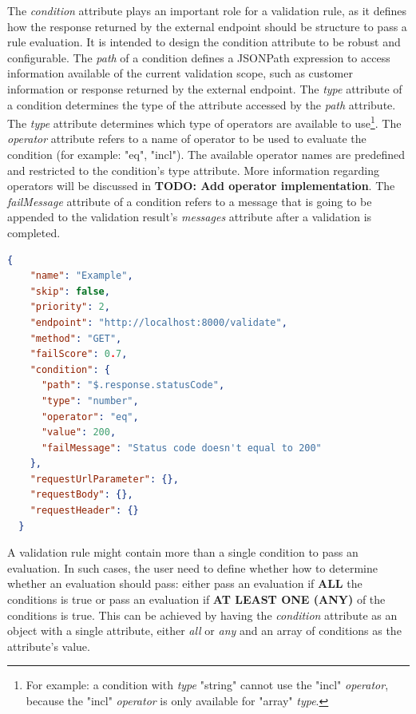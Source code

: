     The \emph{condition} attribute plays an important role for a validation rule, as it defines how the response returned by the external endpoint should be structure to pass a rule evaluation. It is intended to design the condition attribute to be robust and configurable. The \emph{path} of a condition defines a JSONPath\autocite{Friesen2019} expression to access information available of the current validation scope, such as customer information or response returned by the external endpoint. The \emph{type} attribute of a condition determines the type of the attribute accessed by the \emph{path} attribute. The \emph{type} attribute determines which type of operators are available to use\footnote{For example: a condition with \emph{type} "string" cannot use the "incl" \emph{operator}, because the "incl" \emph{operator} is only available for "array" \emph{type}.}. The \emph{operator} attribute refers to a name of operator to be used to evaluate the condition (for example: "eq", "incl"). The available operator names are predefined and restricted to the condition's type attribute. More information regarding operators will be discussed in \textbf{TODO: Add operator implementation}. The \emph{failMessage} attribute of a condition refers to a message that is going to be appended to the validation result's \emph{messages} attribute after a validation is completed.

    \begin{lstlisting}[caption={Validation rule example (JSON)}, language=json]
  {
    "name": "Example",
    "skip": false,
    "priority": 2,
    "endpoint": "http://localhost:8000/validate",
    "method": "GET",
    "failScore": 0.7,
    "condition": {
      "path": "$.response.statusCode",
      "type": "number",
      "operator": "eq",
      "value": 200,
      "failMessage": "Status code doesn't equal to 200"
    },
    "requestUrlParameter": {},
    "requestBody": {},
    "requestHeader": {}
  }
    \end{lstlisting}

    A validation rule might contain more than a single condition to pass an evaluation. In such cases, the user need to define whether how to determine whether an evaluation should pass: either pass an evaluation if \textbf{ALL} the conditions is true or pass an evaluation if \textbf{AT LEAST ONE (ANY)} of the conditions is true. This can be achieved by having the \emph{condition} attribute as an object with a single attribute, either \emph{all} or \emph{any} and an array of conditions as the attribute's value.


